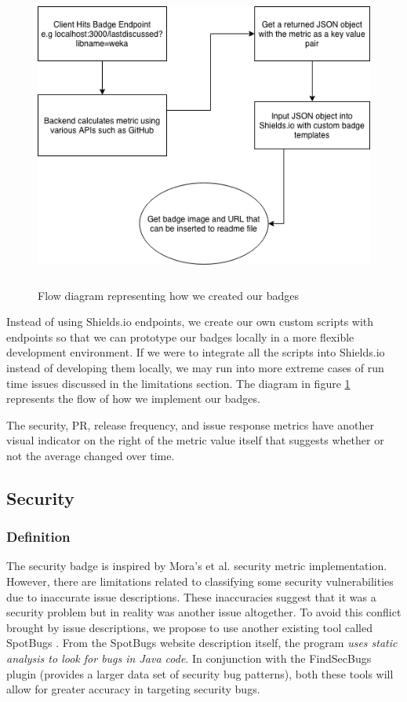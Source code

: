 \documentclass[12pt, letterpaper]{article}
\begin{document}
\begin{figure}[!htb]
    \centerline{
        \includegraphics[width=18cm,height=10cm,keepaspectratio=true]{methods}
    }
    \caption{
        Flow diagram representing how we created our badges
    }
    \label{methods}
\end{figure}

Instead of using Shields.io \cite{shields} endpoints, we create our own custom scripts with endpoints 
so that we can prototype our badges locally in a more flexible development environment.
If we were to integrate all the scripts into Shields.io \cite{shieldsrepo} instead of 
developing them locally, we may run into 
more extreme cases of run time issues discussed in the limitations section. 
The diagram in figure \ref{methods} represents the flow of how we implement our badges.


The security, PR, release frequency, and issue response metrics have
another visual indicator on the right of the metric value itself that suggests
whether or not the average changed over time. 

\subsection{Security}
\subsubsection{Definition}
The security badge is inspired by Mora's et al. \cite{metrics} security metric implementation.
However, there are limitations related to classifying some security vulnerabilities due to inaccurate
issue descriptions. These inaccuracies suggest that it was a security problem but in reality was another issue altogether.
To avoid this conflict brought by issue descriptions, 
we propose to use another existing tool called SpotBugs \cite{spotbugs}.
From the SpotBugs \cite{spotbugs} website description itself, the program \textit{uses static analysis to look for bugs in Java code}.
In conjunction with the FindSecBugs \cite{findsecbugs} plugin (provides a larger data set of security bug patterns), 
both these tools will allow for greater accuracy in targeting security bugs.
\end{document}
